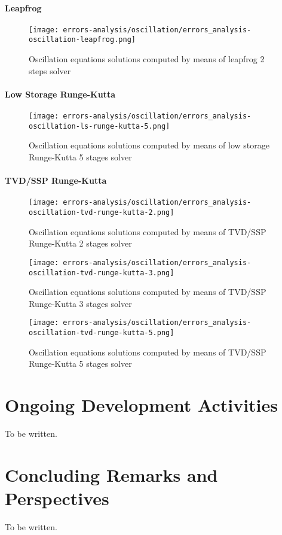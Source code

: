 \documentclass[pdftex,preprint,3p,times,numbers]{elsarticle}
\begin{document}
\paragraph{Leapfrog}

\begin{figure}[!ht]
  \centering
  \texttt{[image: errors-analysis/oscillation/errors\_analysis-oscillation-leapfrog.png]}
  \caption{Oscillation equations solutions computed by means of leapfrog 2 steps solver}\label{fig:results-oscillation-leapfrog}
\end{figure}

\paragraph{Low Storage Runge-Kutta}

\begin{figure}[!ht]
  \centering
  \texttt{[image: errors-analysis/oscillation/errors\_analysis-oscillation-ls-runge-kutta-5.png]}
  \caption{Oscillation equations solutions computed by means of low storage Runge-Kutta 5 stages solver}\label{fig:results-oscillation-ls-runge-kutta-5}
\end{figure}

\paragraph{TVD/SSP Runge-Kutta}

\begin{figure}[!ht]
  \centering
  \texttt{[image: errors-analysis/oscillation/errors\_analysis-oscillation-tvd-runge-kutta-2.png]}
  \caption{Oscillation equations solutions computed by means of TVD/SSP Runge-Kutta 2 stages solver}\label{fig:results-oscillation-tvd-runge-kutta-2}
\end{figure}

\begin{figure}[!ht]
  \centering
  \texttt{[image: errors-analysis/oscillation/errors\_analysis-oscillation-tvd-runge-kutta-3.png]}
  \caption{Oscillation equations solutions computed by means of TVD/SSP Runge-Kutta 3 stages solver}\label{fig:results-oscillation-tvd-runge-kutta-3}
\end{figure}

\begin{figure}[!ht]
  \centering
  \texttt{[image: errors-analysis/oscillation/errors\_analysis-oscillation-tvd-runge-kutta-5.png]}
  \caption{Oscillation equations solutions computed by means of TVD/SSP Runge-Kutta 5 stages solver}\label{fig:results-oscillation-tvd-runge-kutta-5}
\end{figure}

\clearpage

\section{Ongoing Development Activities}\label{sec:ongoing}

{\color{red} To be written.}

\section{Concluding Remarks and Perspectives}\label{sec:conclusions}

{\color{red} To be written.}



\end{document}
